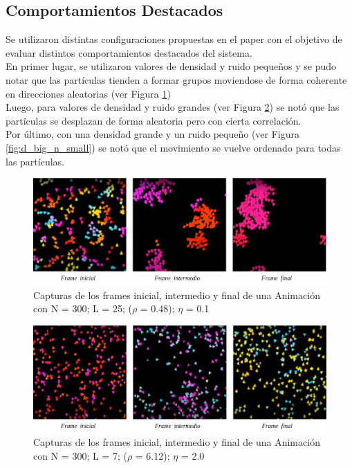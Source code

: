 \documentclass[12pt, a4paper]{report}
\begin{document}
\subsection{Comportamientos Destacados}

Se utilizaron distintas configuraciones propuestas en el paper \cite{vicsek1995novel} con el objetivo de evaluar distintos comportamientos destacados del sistema.\\

En primer lugar, se utilizaron valores de densidad y ruido pequeños y se pudo notar que las partículas tienden a formar grupos moviendose de forma coherente en direcciones aleatorias (ver Figura \ref{fig:d_n_small})\\  

Luego, para valores de densidad y ruido grandes (ver Figura \ref{fig:d_n_big}) se notó que las partículas se desplazan de forma aleatoria pero con cierta correlación.\\

Por último, con una densidad grande y un ruido pequeño (ver Figura \ref{fig:d_big_n_small}) se notó que el movimiento se vuelve ordenado para todas las partículas.
 
\begin{figure}[h]
\includegraphics[scale=0.4]{d_n_small.png}
\centering 
\caption{Capturas de los frames inicial, intermedio y final de una Animación con  N = 300; L = 25;	($\rho$ = 0.48); $\eta$ = 0.1}
\label{fig:d_n_small}
\end{figure}


\begin{figure}[h]
\includegraphics[scale=0.4]{d_n_big.png}
\centering 
\caption{Capturas de los frames inicial, intermedio y final de una Animación con N = 300; L = 7; ($\rho$ = 6.12); $\eta$ = 2.0}
\label{fig:d_n_big}
\end{figure}
\end{document}
